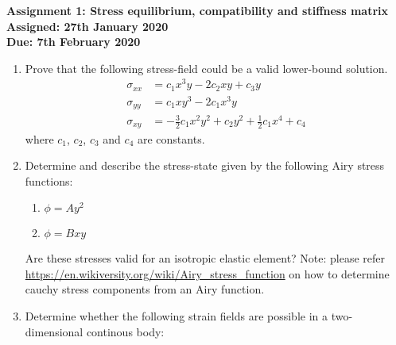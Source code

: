 \documentclass[a4paper,12pt]{article}
\begin{document}
\begin{centering}
	\textbf{
		Assignment 1: Stress equilibrium, compatibility and stiffness matrix\\
		Assigned: 27th January 2020\\
		Due: 7th February 2020\\
	}
\end{centering}

\vspace{1em}
 
\begin{enumerate}
	\item Prove that the following stress-field could be a valid lower-bound solution.
	\begin{align*}
		\sigma_{xx} & = c_1 x^3 y - 2c_2 xy + c_3 y\\
		\sigma_{yy} & = c_1 x y^3 - 2c_1 x^3 y\\
		\sigma_{xy} & = -\frac{3}{2}c_1x^2y^2 + c_2 y^2 + \frac{1}{2}c_1 x^4 + c_4
	\end{align*}
	where $c_1$, $c_2$, $c_3$ and $c_4$ are constants.

	\item Determine and describe the stress-state given by the following Airy stress functions:
	\begin{enumerate}
		\item $\phi = Ay^2$ 
		\item $\phi = Bxy$
	\end{enumerate}
	Are these stresses valid for an isotropic elastic element? Note: please refer \url{https://en.wikiversity.org/wiki/Airy_stress_function} on how to determine cauchy stress components from an Airy function.

	\item Determine whether the following strain fields are possible in a two-dimensional continous body:
	

\end{enumerate}
\end{document}
